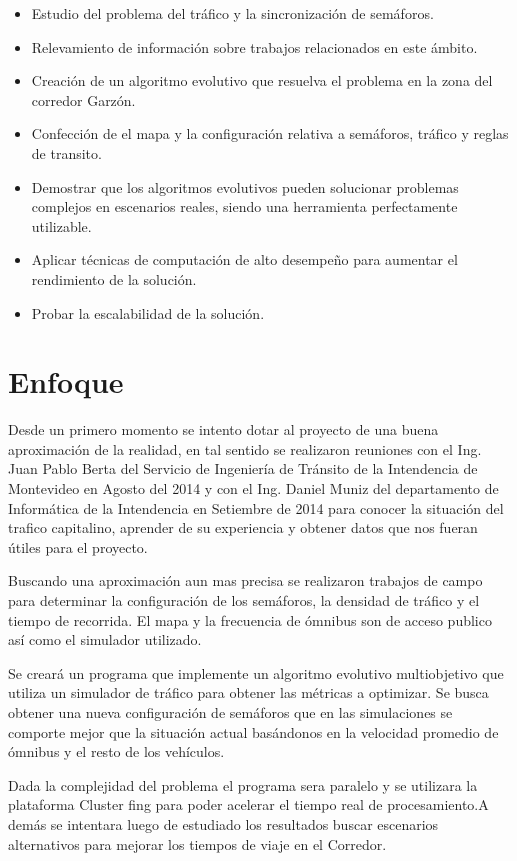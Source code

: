 \begin{itemize}
	\item Estudio del problema del tráfico y la sincronización de semáforos.
	\item Relevamiento de información sobre trabajos relacionados en este ámbito.
	\item Creación de un algoritmo evolutivo que resuelva el problema en la zona del corredor Garzón.
	\item Confección de el mapa y la configuración relativa a semáforos, tráfico y reglas de transito.	
	\item Demostrar que los algoritmos evolutivos pueden solucionar problemas complejos en escenarios  reales, siendo una herramienta perfectamente utilizable.
	\item Aplicar técnicas de computación de alto desempeño para aumentar el rendimiento de la solución.
	\item Probar la escalabilidad de la solución.
\end{itemize}

 
\section{Enfoque}

Desde un primero momento se intento dotar al proyecto de una buena aproximación de la realidad, en tal sentido se realizaron reuniones con el Ing. Juan Pablo Berta del Servicio de Ingeniería de Tránsito de la Intendencia de Montevideo en Agosto del  2014 y con el Ing. Daniel Muniz del departamento de Informática de la Intendencia en Setiembre de 2014 para conocer la situación del trafico capitalino, aprender de su experiencia y obtener datos que nos fueran útiles para el proyecto.


Buscando una aproximación aun mas precisa se realizaron trabajos de campo para determinar la configuración de los semáforos, la densidad de tráfico y el tiempo de recorrida. El mapa y la frecuencia de ómnibus son de acceso publico así como el simulador utilizado.

Se creará un programa que implemente un algoritmo evolutivo multiobjetivo que utiliza un simulador de tráfico para obtener las métricas a optimizar. Se busca obtener una nueva configuración de semáforos que en las simulaciones se comporte mejor que la situación actual basándonos en la velocidad promedio de ómnibus y el resto de los vehículos.

Dada la complejidad del problema el programa sera paralelo y se utilizara la plataforma Cluster fing para poder acelerar el tiempo real de procesamiento.A demás se intentara luego de estudiado los resultados buscar escenarios alternativos para mejorar los tiempos de viaje en el Corredor.

